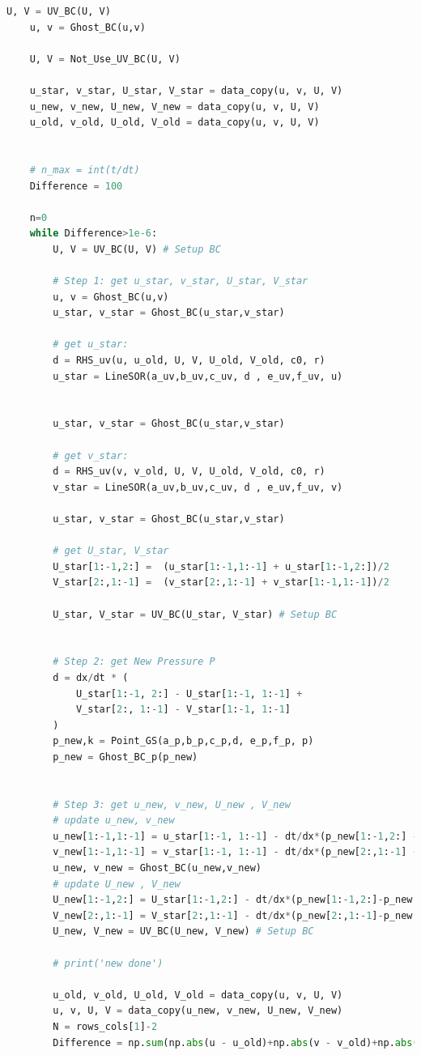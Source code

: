 \documentclass[12pt]{article}
\begin{document}
\begin{scriptsize}
\begin{lstlisting}[language=python,caption={ADI Solver}]
    U, V = UV_BC(U, V)
    u, v = Ghost_BC(u,v)

    U, V = Not_Use_UV_BC(U, V) 

    u_star, v_star, U_star, V_star = data_copy(u, v, U, V) 
    u_new, v_new, U_new, V_new = data_copy(u, v, U, V) 
    u_old, v_old, U_old, V_old = data_copy(u, v, U, V)


    # n_max = int(t/dt)
    Difference = 100

    n=0
    while Difference>1e-6:
        U, V = UV_BC(U, V) # Setup BC

        # Step 1: get u_star, v_star, U_star, V_star
        u, v = Ghost_BC(u,v)
        u_star, v_star = Ghost_BC(u_star,v_star)

        # get u_star:    
        d = RHS_uv(u, u_old, U, V, U_old, V_old, c0, r)
        u_star = LineSOR(a_uv,b_uv,c_uv, d , e_uv,f_uv, u)


        u_star, v_star = Ghost_BC(u_star,v_star)

        # get v_star:
        d = RHS_uv(v, v_old, U, V, U_old, V_old, c0, r) 
        v_star = LineSOR(a_uv,b_uv,c_uv, d , e_uv,f_uv, v)

        u_star, v_star = Ghost_BC(u_star,v_star)

        # get U_star, V_star
        U_star[1:-1,2:] =  (u_star[1:-1,1:-1] + u_star[1:-1,2:])/2
        V_star[2:,1:-1] =  (v_star[2:,1:-1] + v_star[1:-1,1:-1])/2

        U_star, V_star = UV_BC(U_star, V_star) # Setup BC


        # Step 2: get New Pressure P
        d = dx/dt * (
            U_star[1:-1, 2:] - U_star[1:-1, 1:-1] +
            V_star[2:, 1:-1] - V_star[1:-1, 1:-1]
        )
        p_new,k = Point_GS(a_p,b_p,c_p,d, e_p,f_p, p)
        p_new = Ghost_BC_p(p_new)


        # Step 3: get u_new, v_new, U_new , V_new
        # update u_new, v_new
        u_new[1:-1,1:-1] = u_star[1:-1, 1:-1] - dt/dx*(p_new[1:-1,2:] - p_new[1:-1,:-2])/2 
        v_new[1:-1,1:-1] = v_star[1:-1, 1:-1] - dt/dx*(p_new[2:,1:-1] - p_new[:-2,1:-1])/2 
        u_new, v_new = Ghost_BC(u_new,v_new)
        # update U_new , V_new
        U_new[1:-1,2:] = U_star[1:-1,2:] - dt/dx*(p_new[1:-1,2:]-p_new[1:-1,1:-1])
        V_new[2:,1:-1] = V_star[2:,1:-1] - dt/dx*(p_new[2:,1:-1]-p_new[1:-1,1:-1])
        U_new, V_new = UV_BC(U_new, V_new) # Setup BC

        # print('new done')

        u_old, v_old, U_old, V_old = data_copy(u, v, U, V)
        u, v, U, V = data_copy(u_new, v_new, U_new, V_new)
        N = rows_cols[1]-2
        Difference = np.sum(np.abs(u - u_old)+np.abs(v - v_old)+np.abs(p_new - p))/N**2


\end{lstlisting}
\end{scriptsize}
\end{document}
